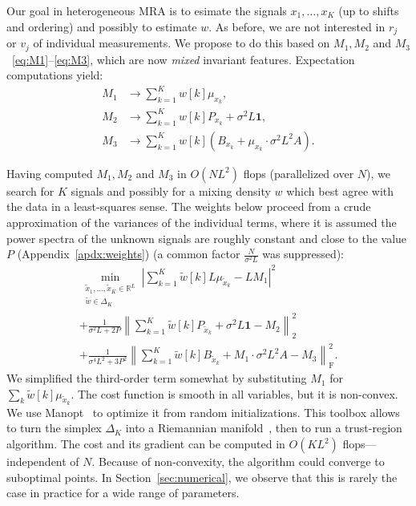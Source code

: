 \documentclass[english]{article}
\numberwithin{equation}{section}
\numberwithin{figure}{section}
\theoremstyle{plain}
\theoremstyle{definition}
\theoremstyle{remark}
\theoremstyle{plain}
\theoremstyle{remark}
\theoremstyle{plain}
\theoremstyle{plain}
\newcommand{\RL}{\mathbb{R}^L}
\begin{document}
Our goal in heterogeneous MRA is to esimate the signals $x_1, \ldots, x_K$ (up to shifts and ordering) and possibly to estimate $w$.  As before, we are not interested in $r_j$ or $v_j$ of individual measurements. 
We propose to do this based on $M_1, M_2$ and $M_3$~\eqref{eq:M1}--\eqref{eq:M3}, which are now \emph{mixed} invariant features. Expectation computations yield: %
\begin{align}
	M_1 & \to \sum_{k = 1}^K w[k] \mu_{x_k}, \\
	M_2 & \to \sum_{k = 1}^K w[k] P_{x_k} + \sigma^2 L \mathbf{1}, \\
	M_3 & \to \sum_{k = 1}^K w[k] \left(B_{x_k} + \mu_{x_k} \cdot \sigma^2 L^2 A\right).
\end{align}


Having computed $M_1, M_2$ and $M_3$ in $O(NL^2)$ flops (parallelized over $N$), we search for $K$ signals and possibly for a mixing density $w$ which best agree with the data in a least-squares sense.
The weights below proceed from a crude approximation of the variances of the individual terms, where it is assumed the power spectra of the unknown signals are roughly constant and close to the value $P$ (Appendix~\ref{apdx:weights})
(a common factor $\frac{N}{\sigma^2 L}$ was suppressed):
\begin{multline}
	\min_{\substack{\tilde x_1,\dots,\tilde x_K\in\RL \\ \tilde w\in\Delta_K}}    \left|\sum_{k=1}^{K} \tilde w[k] L\mu_{\tilde x_k} - LM_1\right|^2 \\ + 
	\frac{1}{\sigma^2 L + 2P} \left\|\sum_{k=1}^{K} \tilde w[k] P_{\tilde x_k} + \sigma^2L \mathbf{1} - M_2\right\|_\textrm{2}^2 \\ +  \frac{1}{\sigma^4 L^2 + 3P^2} \left\|\sum_{k=1}^{K} \tilde w[k] B_{\tilde x_k} + M_1 \cdot \sigma^2L^2 A - M_3\right\|_\textrm{F}^2.
\label{eq:opt}
\end{multline}
We simplified the third-order term somewhat by substituting $M_1$ for $\sum_k \tilde w[k] \mu_{\tilde x_k}$. The cost function is smooth in all variables, but it is non-convex. We use Manopt~\cite{manopt} to optimize it from random initializations. This toolbox allows to turn the simplex $\Delta_K$ into a Riemannian manifold~\cite{sun2015multinomial}, then to run a trust-region algorithm. %
The cost and its gradient can be computed in $O(KL^2)$ flops---independent of $N$. Because of non-convexity, the algorithm could converge to suboptimal points. In Section~\ref{sec:numerical}, we observe that this is rarely the case in practice for a wide range of parameters.
\end{document}
